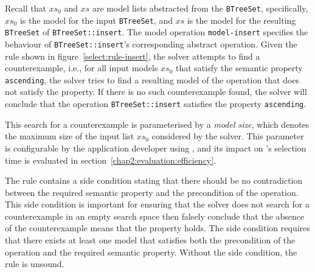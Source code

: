 \noindent Recall that $xs_0$ and $xs$ are model lists abstracted from the \lstinline|BTreeSet|, specifically, $xs_0$ is the model for the input \lstinline|BTreeSet|, and $xs$ is the model for the resulting \lstinline|BTreeSet| of \lstinline|BTreeSet::insert|. 
The model operation \lstinline|model-insert| specifies the behaviour of \lstinline|BTreeSet::insert|'s corresponding abstract operation. 
Given the rule shown in figure~\ref{select:rule-insert}, the solver attempts to find a counterexample, i.e., for all input models $xs_0$ that satisfy the semantic property \lstinline|ascending|, the solver tries to find a resulting model of the operation that does not satisfy the property. 
If there is no such counterexample found, the solver will conclude that the operation \lstinline|BTreeSet::insert| satisfies the property \lstinline|ascending|.

This search for a counterexample is parameterised by a \emph{model size}, which denotes the maximum size of the input list $xs_0$ considered by the solver. This 
parameter is configurable by the application developer using \Primrose{}, and its impact on \Primrose{}'s selection time is evaluated in section~\ref{chap2:evaluation:efficiency}.

The rule contains a side condition stating that there should be no contradiction between the required semantic property and the precondition of the operation.
This side condition is important for ensuring that the solver does not search for a counterexample in an empty search space then falsely conclude that the absence of the counterexample means that the property holds.
The side condition requires that there exists at least one model that satisfies both the precondition of the operation and the required semantic property.
Without the side condition, the rule is unsound.

